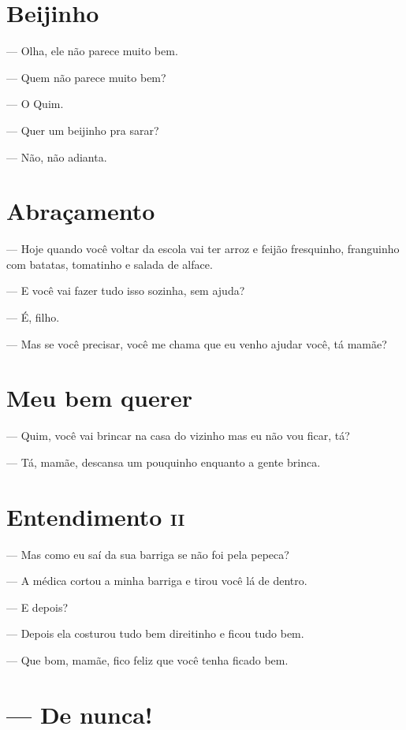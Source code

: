 \chapter{Beijinho}\label{beijinho}

{\parindent0pt\parskip1pt\raggedright
--- Olha, ele não parece muito bem.

--- Quem não parece muito bem?

--- O Quim.

--- Quer um beijinho pra sarar?

--- Não, não adianta.

\chapter{Abraçamento}\label{abrauxe7amento}

--- Hoje quando você voltar da escola vai ter arroz e feijão fresquinho,
franguinho com batatas, tomatinho e salada de alface.

--- E você vai fazer tudo isso sozinha, sem ajuda?

--- É, filho.

--- Mas se você precisar, você me chama que eu venho ajudar você, tá
mamãe?

\chapter{Meu bem querer}\label{meu-bem-querer}

--- Quim, você vai brincar na casa do vizinho mas eu não vou ficar, tá?

--- Tá, mamãe, descansa um pouquinho enquanto a gente brinca.

\chapter{Entendimento \textsc{ii}}

--- Mas como eu saí da sua barriga se não foi pela pepeca?

--- A médica cortou a minha barriga e tirou você lá de dentro.

--- E depois?

--- Depois ela costurou tudo bem direitinho e ficou tudo bem.

--- Que bom, mamãe, fico feliz que você tenha ficado bem.}

\chapter{--- De nunca!}\label{de-nunca}

